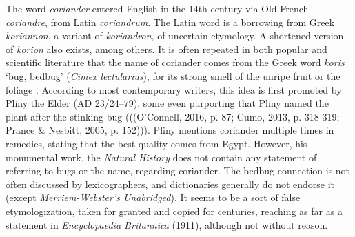 The word \textit{coriander} entered English in the 14th century via Old French \textit{coriandre}, from Latin \textit{coriandrum}. The Latin word is a borrowing from Greek \textit{koriannon}, a variant of \textit{koriandron}, of uncertain etymology. A shortened version of \textit{korion} also exists, among others. It is often repeated in both popular and scientific literature that the name of coriander comes from the Greek word \textit{koris} `bug, bedbug' (\textit{Cimex lectularius}), for its strong smell of the unripe fruit or the foliage \parencite[cf.][]{harper_coriander_nodate}. According to most contemporary writers, this idea is first promoted by Pliny the Elder (AD 23/24–79), some even purporting that Pliny named the plant after the stinking bug \parencite{oconnell_book_2016, cumo_encyclopedia_2013, prance_cultural_2005} (((O’Connell, 2016, p. 87; Cumo, 2013, p. 318-319; Prance \& Nesbitt, 2005, p. 152))). Pliny mentions coriander multiple times in remedies, stating that the best quality comes from Egypt. However, his monumental work, the \textit{Natural History} \parencite{pliny_the_elder_natural_1855} does not contain any statement of referring to bugs or the name, regarding coriander. The bedbug connection is not often discussed by lexicographers, and dictionaries generally do not endorse it (except \textit{Merriem-Webster’s Unabridged}). It seems to be a sort of false etymologization, taken for granted and copied for centuries, reaching as far as a statement in \textit{Encyclopaedia Britannica} (1911), although not without reason.

